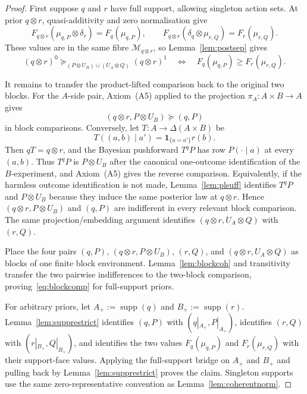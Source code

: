 \documentclass[11pt,a4paper]{article}
\theoremstyle{definition}
\newcommand{\1}{\mathbf 1}
\begin{document}
\begin{proof}
First suppose $q$ and $r$ have full support, allowing singleton action sets.  At prior $q\otimes r$, quasi-additivity and
zero normalisation give
\[
F_{q\otimes r}(\mu_{q,P}\otimes\delta_r)=F_q(\mu_{q,P}),
\qquad
F_{q\otimes r}(\delta_q\otimes\mu_{r,Q})=F_r(\mu_{r,Q}).
\]
These values are in the same fibre $\mathcal M_{q\otimes r}$, so Lemma~\ref{lem:postsep} gives
\[
(q\otimes r)^0\succeq_{(P\otimes U_B)\sqcup(U_A\otimes Q)}(q\otimes r)^1
\quad\Longleftrightarrow\quad
F_q(\mu_{q,P})\ge F_r(\mu_{r,Q}).
\]

It remains to transfer the product-lifted comparison back to the original two blocks.  For the $A$-side pair,
Axiom~\textup{(A5)} applied to the projection $\pi_A:A\times B\to A$ gives
\[
(q\otimes r,P\otimes U_B)\succeq(q,P)
\]
in block comparisons.  Conversely, let $T:A\to\Delta(A\times B)$ be
\[
T((a,b)\mid a')=\1_{\{a=a'\}}r(b).
\]
Then $qT=q\otimes r$, and the Bayesian pushforward $T^qP$ has row $P(\cdot\mid a)$ at every $(a,b)$.  Thus
$T^qP$ is $P\otimes U_B$ after the canonical one-outcome identification of the $B$-experiment, and Axiom~\textup{(A5)}
gives the reverse comparison.  Equivalently, if the harmless outcome identification is not made, Lemma~\ref{lem:plsuff}
identifies $T^qP$ and $P\otimes U_B$ because they induce the same posterior law at $q\otimes r$.  Hence
$(q\otimes r,P\otimes U_B)$ and $(q,P)$ are indifferent in every relevant block comparison.  The same
projection/embedding argument identifies $(q\otimes r,U_A\otimes Q)$ with $(r,Q)$.

Place the four pairs $(q,P)$, $(q\otimes r,P\otimes U_B)$, $(r,Q)$, and $(q\otimes r,U_A\otimes Q)$ as blocks of one
finite block environment.  Lemma~\ref{lem:blockcoh} and transitivity transfer the two pairwise indifferences to the
two-block comparison, proving~\eqref{eq:blockcomp} for full-support priors.

For arbitrary priors, let $A_+:=\operatorname{supp}(q)$ and $B_+:=\operatorname{supp}(r)$.  Lemma~\ref{lem:supprestrict}
identifies $(q,P)$ with $(q|_{A_+},P|_{A_+})$, identifies $(r,Q)$ with $(r|_{B_+},Q|_{B_+})$, and identifies the two
values $F_q(\mu_{q,P})$ and $F_r(\mu_{r,Q})$ with their support-face values.  Applying the full-support bridge on
$A_+$ and $B_+$ and pulling back by Lemma~\ref{lem:supprestrict} proves the claim.  Singleton supports use the same
zero-representative convention as Lemma~\ref{lem:coherentnorm}.
\end{proof}
\end{document}
